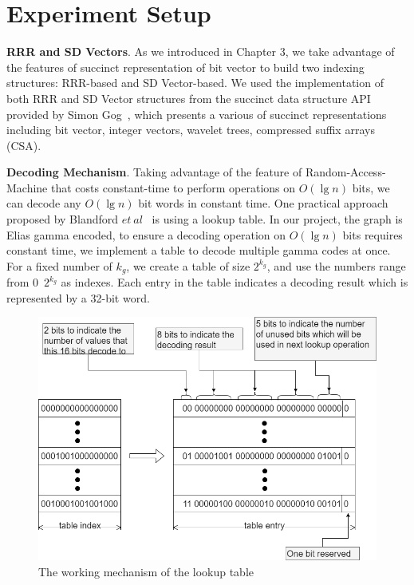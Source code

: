 \documentclass[12pt,glossary]{dalthesis}
\begin{document}
\bigskip
 
\section{Experiment Setup}

\bigskip
\textbf{RRR and SD Vectors}. As we introduced in Chapter 3, we take advantage of the features of succinct representation of bit vector to build two indexing structures: RRR-based and SD Vector-based. We used the implementation of both RRR and SD Vector structures from the succinct data structure API provided by Simon Gog~\cite{sdsl}, which presents a various of succinct representations including bit vector, integer vectors, wavelet trees, compressed suffix arrays (CSA). 

\bigskip
\bigskip

\textbf{Decoding Mechanism}. Taking advantage of the feature of Random-Access-Machine that costs constant-time to perform operations on $O(\lg n)$ bits, we can decode any $O(\lg n)$ bit words in constant time. One practical approach proposed by Blandford $et \ al$~\cite{compact-representation} is using a lookup table. In our project, the graph is Elias gamma encoded, to ensure a decoding operation on $O(\lg n)$ bits requires constant time, we implement a table to decode multiple gamma codes at once. For a fixed number of $k_{g}$, we create a table of size $2^{k_{g}}$, and use the numbers range from 0~$2^{k_{g}}$ as indexes. Each entry in the table indicates a decoding result which is represented by a 32-bit word.  

\bigskip

\begin{figure}[ht]
\centering
\includegraphics[width=1.0\textwidth]{Decoding}
\caption{The working mechanism of the lookup table}
\end{figure}
\end{document}
